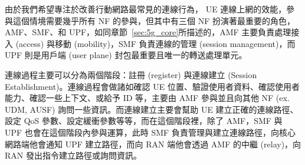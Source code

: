 由於我們希望專注於改善行動網路最常見的連線行為， UE 連線上網的效能，參與這個情境需要幾乎所有 NF 的參與，但其中有三個 NF 扮演著最重要的角色，AMF、SMF、和 UPF，如同章節~\ref{sec:5g_core}所描述的，AMF 主要負責處理接入 (access) 與移動 (mobility)，SMF 負責連線的管理 (session management)，而 UPF 則是用戶端 (user plane) 封包最重要且唯一的轉送處理單元。

連線過程主要可以分為兩個階段：註冊 (register) 與連線建立 (Session Establishment)。連線過程會做諸如確認 UE 位置、驗證使用者資料、確認使用者能力、確認一些上下文、或給予 ID 等，主要由 AMF 參與並且向其他 NF (ex. UDM, AUSF) 詢問一些資訊。而連線建立主要會幫助 UE 建立正確的連線路徑、設定 QoS 參數、設定緩衝參數等等，而在這個階段裡，除了 AMF，SMF 與 UPF 也會在這個階段內參與運算，此時 SMF 負責管理與建立連線路徑，向核心網路端他會通知 UPF 建立路徑，而向 RAN 端他會透過 AMF 的中繼 (relay)，向 RAN 發出指令建立路徑或詢問資訊。

